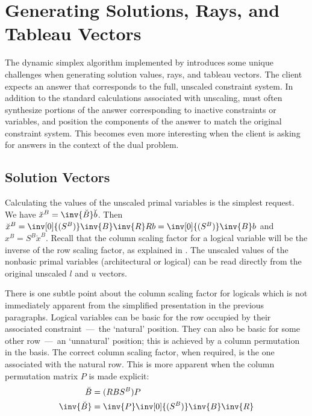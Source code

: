 \section{Generating Solutions, Rays, and Tableau Vectors}
\label{sec:Solutions}

The dynamic simplex algorithm implemented by \dylp introduces some unique
challenges when generating solution values, rays, and tableau vectors.
The client expects an answer that corresponds to the full, unscaled constraint
system.
In addition to the standard calculations associated with unscaling, \dylp must
often synthesize portions of the answer corresponding to inactive constraints
or variables, and position the components of the answer to match the original
constraint system.
This becomes even more interesting when the client is asking for answers in the
context of the dual problem.

\subsection{Solution Vectors}
\label{sec:SolutionVectors}

Calculating the values of the unscaled primal variables is the simplest
request.
We have $\breve{x}^B = \inv{\breve{B}}\breve{b}$.
Then
$\breve{x}^B = \inv[0]{(S^B)}\inv{B}\inv{R} R b = \inv[0]{(S^B)}\inv{B}b$
and
$x^B = S^B \breve{x}^B$.
Recall that the column scaling factor for a logical variable will be the
inverse of the row scaling factor, as explained in .
The unscaled values of the nonbasic primal variables (architectural or logical)
can be read directly from the original unscaled $l$ and $u$ vectors.

There is one subtle point about the column scaling factor for logicals which is
not immediately apparent from the simplified presentation in the previous
paragraphs.
Logical variables can be basic for the row occupied by their associated
constraint~---~the `natural' position.
They can also be basic for some other row~---~an `unnatural' position; this is
achieved by a column permutation in the basis.
The correct column scaling factor, when required, is the one associated with
the natural row.
This is more apparent when the column permutation matrix $P$ is made explicit:
\begin{align*}
\breve{B} & = (R B S^B) P \\
\inv{\breve{B}} & = \inv{P}\inv[0]{(S^B)}\inv{B}\inv{R}
\end{align*}

